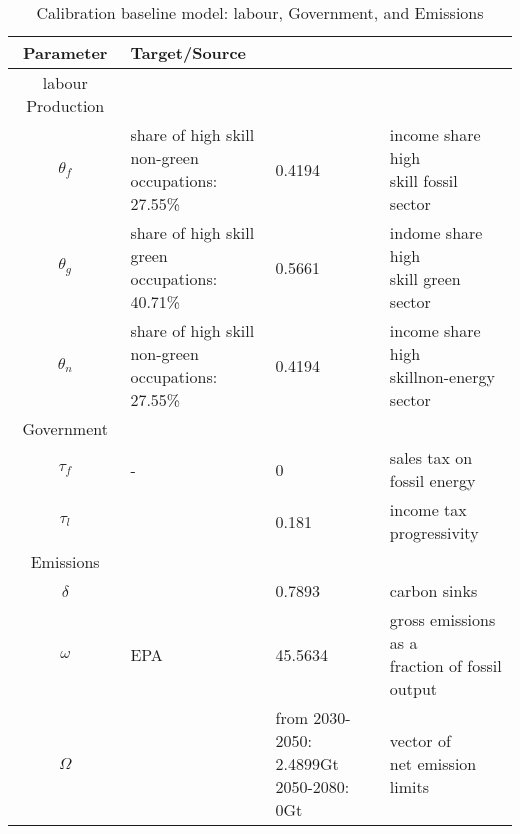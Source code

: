  \begin{table}[hh!!!!!]
 	\begin{center}
 		\captionsetup{width=0.9\textwidth}
 		\caption{ Calibration baseline model: labour, Government, and Emissions}
 		\label{tab:calib2}
 		\begin{tabular}{c|lll}
 			\hline \hline
 			Parameter& Target/Source& \makecell[l]{Calibration}& \makecell[l]{Meaning}\\ 
 			\hline
 			\hline
 			labour Production&\multicolumn{3}{c}{}\\
 			\hline 
 			
 			\hline
 			$\theta_f$&\makecell[l]{share of high skill\\ non-green occupations: \\27.55\% }&0.4194&\makecell[l]{income share high \\ skill fossil sector}\\
 			\hline
 			$\theta_g$&\makecell[l]{share of high skill\\ green occupations: \\40.71\% }&0.5661&\makecell[l]{indome share high \\skill green sector}\\
 			\hline
 			$\theta_n$&\makecell[l]{share of high skill\\ non-green occupations: \\27.55\% }&0.4194&\makecell[l]{income share high \\ skillnon-energy sector}\\
 			\hline
 			\hline
 			Government&\multicolumn{3}{c}{}\\
 			\hline
 			
 			\hline
 			$\tau_f$&- &0& sales tax on fossil energy\\
 			\hline
 			$\tau_l$&\cite{Heathcote2017OptimalFramework} &0.181& income tax progressivity\\
 			\hline	
 			\hline
 			Emissions&\multicolumn{3}{c}{}\\
 			\hline
 			
 			\hline
 			$\delta$& \makecell[l]{EPA}&0.7893&carbon sinks \\
 			\hline
 			$\omega$& EPA&45.5634& \makecell[l]{ gross emissions as a\\ fraction of fossil output}\\
 			\hline
 			$\Omega$& \cite{IPCC2022}&\makecell[l]{from 2030-2050: 2.4899Gt\\2050-2080: 0Gt}& \makecell[l]{vector of \\ net emission limits}\\
 			\hline \hline
 		\end{tabular}
 	\end{center}
 \end{table}
